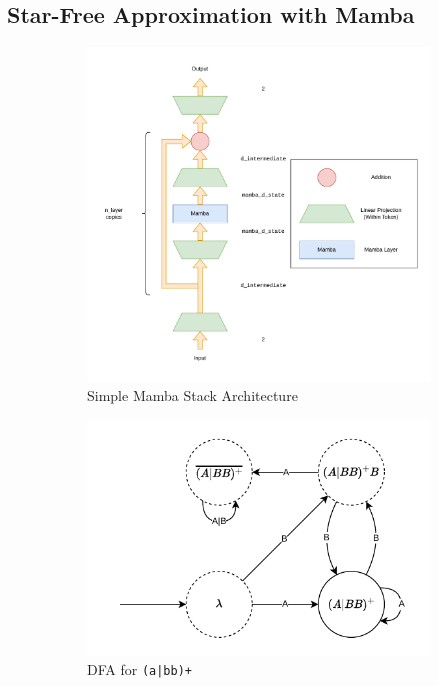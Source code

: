 \subsection{Star-Free Approximation with Mamba}
\begin{figure}
    
\begin{subfigure}{0.5\textwidth}
    \includegraphics[width=\textwidth]{figures/sequence_stack_simple.pdf}
    \caption{Simple Mamba Stack Architecture}
    \label{simplestack}
\end{subfigure}\begin{subfigure}{0.5\textwidth}
    \includegraphics[width=\textwidth]{figures/a_or_bb_plus_dfa.pdf}
    \caption{DFA for \texttt{(a|bb)+}}
    \label{a_or_bb_plus_dfa}
\end{subfigure}
    \caption{}
\end{figure}

